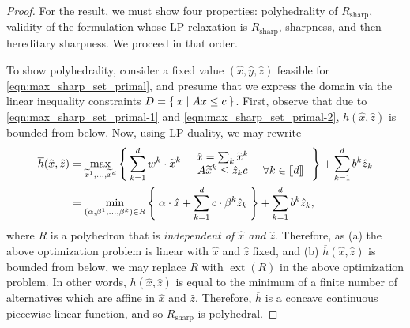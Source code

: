 \documentclass[smallextended]{svjour3}
\newcommand{\ext}{\operatorname{ext}}
\newcommand{\tx}{\widetilde{x}}
\newcommand{\Rsharp}{R_{\operatorname{sharp}}}
\renewcommand{\bar}[1]{\overline{#1}}
\begin{document}
\begin{proof}
For the result, we must show four properties: polyhedrality of $\Rsharp$, validity of the formulation whose LP relaxation is $\Rsharp$, sharpness, and then hereditary sharpness. We proceed in that order.

To show polyhedrality, consider a fixed value $(\hat{x},\hat{y},\hat{z})$ feasible for \eqref{eqn:max_sharp_set_primal}, and presume that we express the domain via the linear inequality constraints $D = \Set{x | Ax \leq c}$. First, observe that due to \eqref{eqn:max_sharp_set_primal-1} and \eqref{eqn:max_sharp_set_primal-2}, $\bar{h}(\hat{x},\hat{z})$ is bounded from below. Now, using LP duality, we may rewrite
\begin{align*}
    \bar{h}(\hat{x},\hat{z}) &= \max_{\tx^1, \ldots, \tx^d}\Set{\sum_{k=1}^d w^k \cdot \tx^k | \begin{array}{cc} \hat{x} = \sum_k \tx^k & \\ A \tx^k \leq \hat{z}_k c &\ \forall k \in \llbracket d \rrbracket \end{array}} + \sum_{k=1}^d b^k \hat{z}_k \\
    &= \min_{(\alpha, \beta^1, \ldots, \beta^k) \in R} \Set{ \alpha \cdot \hat{x} + \sum_{k=1}^d c \cdot \beta^k \hat{z}_k} + \sum_{k=1}^d b^k\hat{z}_k,
\end{align*}
where $R$ is a polyhedron that is \emph{independent of $\hat{x}$ and $\hat{z}$}. 
Therefore, as (a) the above optimization problem is linear with $\hat{x}$ and $\hat{z}$ fixed, and (b) $\bar{h}(\hat{x},\hat{z})$ is bounded from below, we may replace $R$ with $\ext(R)$ in the above optimization problem.
In other words, $\bar{h}(\hat{x},\hat{z})$ is equal to the minimum of a finite number of alternatives which are affine in $\hat{x}$ and $\hat{z}$. Therefore, $\bar{h}$ is a concave continuous piecewise linear function, and so $\Rsharp$ is polyhedral.


\end{proof}
\end{document}
